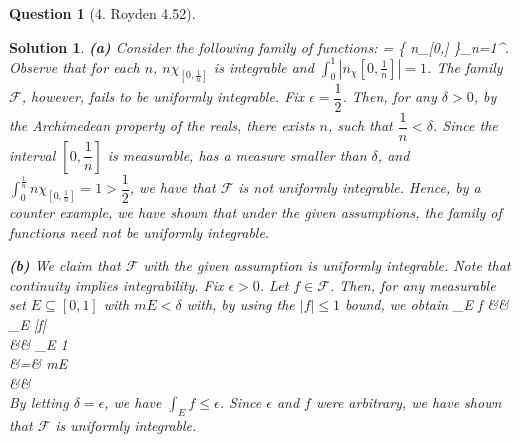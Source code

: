 \documentclass{article} %
\def\eQb#1\eQe{\begin{eqnarray*}#1\end{eqnarray*}}
\theoremstyle{quest}
\newtheorem*{question}{Question}
\newtheorem*{solution}{Solution}
\begin{document}
\begin{question}[4. Royden 4.52]
\end{question}
\begin{solution}
\textbf{(a)} Consider the following family of functions:
\eQb
\mathscr{F} = \{ n\chi_{[0,]} 
\}_{n=1}^{\infty}. 
\eQe
Observe that for each $n$, $n\chi_{[0,\frac{1}{n}]}$ is 
integrable and $\int_{0}^{1} |n_\chi{[0,\frac{1}{n}]}| = 1$.
The family $\mathscr{F}$, however, fails to be uniformly integrable.
Fix $\epsilon = \dfrac{1}{2}$. Then, for any $\delta > 0$, by the 
Archimedean property of the reals, there exists $n$, such that
$\dfrac{1}{n} < \delta$. Since the interval $[0,\dfrac{1}{n}]$ 
is measurable, has a measure smaller than $\delta$, and 
$\int_{0}^{\frac{1}{n}} n\chi_{[0,\frac{1}{n}]} = 1 > \dfrac{1}{2}$, 
we have that $\mathscr{F}$ is not uniformly integrable. Hence, by
a counter example, we have shown that under the given assumptions,
the family of functions need not be uniformly integrable. 

\smallskip

\textbf{(b)} We claim that $\mathscr{F}$ with the given assumption
is uniformly integrable. Note that continuity implies integrability.
Fix $\epsilon > 0$. 
Let $f \in \mathscr{F}$. 
Then, for any measurable set $E \subseteq [0,1]$ with
$mE < \delta$ with, by using the $|f| \leq 1$ bound, we obtain 
\eQb
\int_{E} f &\leq& \int_{E} |f| \\
&\leq& \int_{E} 1 \\
&=& mE \\
&\leq& \delta \\
\eQe
By letting $\delta = \epsilon$, we have $\int_{E} f \leq \epsilon$.
Since $\epsilon$ and $f$ were arbitrary, we have shown that
$\mathscr{F}$ is uniformly integrable. 

\smallskip


\end{solution}
\end{document}
